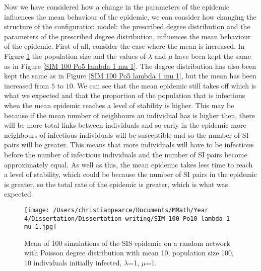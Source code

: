 \documentclass{uonmathsreport}
\begin{document}
Now we have considered how a change in the parameters of the epidemic influences the mean behaviour of the epidemic, we can consider how changing the structure of the configuration model: the prescribed degree distribution and the parameters of the prescribed degree distribution, influences the mean behaviour of the epidemic. First of all, consider the case where the mean is increased. In Figure \ref{SIM 100 Po10 lambda 1 mu 1} the population size and the values of $\lambda$ and $\mu$ have been kept the same as in Figure \ref{SIM 100 Po5 lambda 1 mu 1}. The degree distribution has also been kept the same as in Figure \ref{SIM 100 Po5 lambda 1 mu 1}, but the mean has been increased from $5$ to $10$. We can see that the mean epidemic still takes off which is what we expected and that the proportion of the population that is infectious when the mean epidemic reaches a level of stability is higher. This may be because if the mean number of neighbours an individual has is higher then, there will be more total links between individuals and so early in the epidemic more neighbours of infectious individuals will be susceptible and so the number of SI pairs will be greater. This means that more individuals will have to be infectious before the number of infectious individuals and the number of SI pairs become approximately equal. As well as this, the mean epidemic takes less time to reach a level of stability, which could be because the number of SI pairs in the epidemic is greater, so the total rate of the epidemic is greater, which is what was expected.

\begin{figure}
\begin{center}
\texttt{[image: /Users/christianpearce/Documents/MMath/Year 4/Dissertation/Dissertation writing/SIM 100 Po10 lambda 1 mu 1.jpg]}
\end{center}
\caption{Mean of 100 simulations of the SIS epidemic on a random network with Poisson degree distribution with mean 10, population size 100, 10 individuals initially infected, $\lambda$=1, $\mu$=1.}
\label{SIM 100 Po10 lambda 1 mu 1}
\end{figure}
\end{document}
